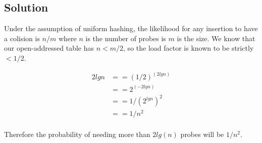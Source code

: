 \subsection*{Solution}

Under the assumption of uniform hashing, the likelihood for any insertion to have a colision is $n/m$ where $n$ is the number of probes is $m$ is the size. We know that our open-addressed table has $n < m/2$, so the load factor is known to be strictly $< 1/2$.

\begin{align*}
  2 lg n &== (1/2)^{(2 lg n)} \\
         &== 2^{(-2 lg n)} \\
         &== 1/{(2^{lg n})^2} \\
         &== 1/n^2 \\
\end{align*}

Therefore the probability of needing more than $2lg(n)$ probes will be $1/n^2$.
